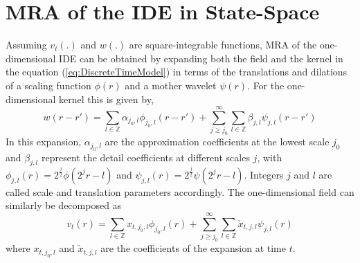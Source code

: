 \documentclass[journal,a4paper]{IEEEtran}
\begin{document}
\section{MRA of the IDE in State-Space}
Assuming $v_t(.)$ and $w(.)$ are square-integrable functions, MRA of the one-dimensional IDE can be obtained by expanding  both the field and the kernel in the equation (\ref{eq:DiscreteTimeModel}) in terms of the translations and dilations of a scaling function $\phi(r)$ and a mother wavelet $\psi(r)$. For the one-dimensional kernel this is given by,
\begin{equation}
 w\left(r-r'\right)=\sum_{l \in \mathbb{Z}}\alpha_{j_0,l}\phi_{j_0,l}\left(r-r'\right)+\sum_{j\geq j_0}^{\infty} \sum_{l \in \mathbb{Z}}\beta_{j,l}\psi_{j,l}\left(r-r'\right) 
\label{eq:KernelExpansion}
\end{equation}
In this expansion, $\alpha_{j_0,l}$ are the approximation coefficients at the lowest scale $j_0$ and $ \beta_{j,l}$ represent the detail coefficients at different scales $j$, with $\phi_{j,l}\left(r\right)=2^{\frac{j}{2}}\phi\left(2^jr-l\right) $ and $\psi_{j,l}\left(r\right)=2^{\frac{j}{2}}\psi\left(2^jr-l\right)$. Integers $j$ and $l$ are called scale and translation parameters accordingly. The one-dimensional field can similarly be decomposed as
\begin{equation}
 v_t\left(r\right)=\sum_{l \in \mathbb{Z}}x_{t,j_{0},l}\phi_{j_{0},l}\left(r\right)+\sum_{j\geq j_0}^{\infty} \sum_{l \in \mathbb{Z}} \check{x}_{t,j,l}\psi_{j,l}\left(r\right)
\label{eq:FieldExpansion}
\end{equation}
where $ x_{t,j_{0},l}$ and $\check{x}_{t,j,l} $ are the coefficients of the expansion at time $t$.
\end{document}
